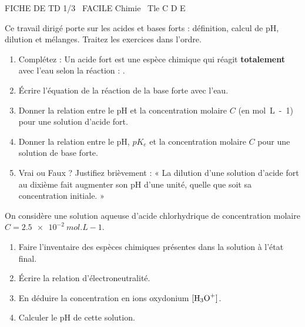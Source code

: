 \documentclass[11pt]{article}
\begin{document}
\begin{tcolorbox}[enhanced,colback=popink,colframe=popink,arc=10pt,boxrule=0pt,left=12pt,right=12pt,top=9pt,bottom=9pt]
{\color{white}\popxbold\small FICHE DE TD 1/3 \textbullet\ FACILE \hfill Chimie \textbullet\ Tle C D E\par}
\end{tcolorbox}
\vspace{4pt}
\noindent Ce travail dirigé porte sur les acides et bases forts : définition, calcul de pH, dilution et mélanges. Traitez les exercices dans l'ordre.

\begin{exercice}
\begin{enumerate}
    \item Complétez : Un acide fort est une espèce chimique qui réagit \textbf{totalement} avec l'eau selon la réaction : .
    \item Écrire l'équation de la réaction de la base forte  avec l'eau.
    \item Donner la relation entre le pH et la concentration molaire $C$ (en \si{mol.L-1}) pour une solution d'acide fort.
    \item Donner la relation entre le pH, $pK_e$ et la concentration molaire $C$ pour une solution de base forte.
    \item Vrai ou Faux ? Justifiez brièvement : « La dilution d'une solution d'acide fort au dixième fait augmenter son pH d'une unité, quelle que soit sa concentration initiale. »
\end{enumerate}
\end{exercice}

\begin{exercice}
On considère une solution aqueuse d'acide chlorhydrique  de concentration molaire $C = \SI{2,5e-2}{mol.L-1}$.
\begin{enumerate}
    \item Faire l'inventaire des espèces chimiques présentes dans la solution à l'état final.
    \item Écrire la relation d'électroneutralité.
    \item En déduire la concentration en ions oxydonium $[\ce{H3O+}]$.
    \item Calculer le pH de cette solution.
\end{enumerate}
\end{exercice}
\end{document}
